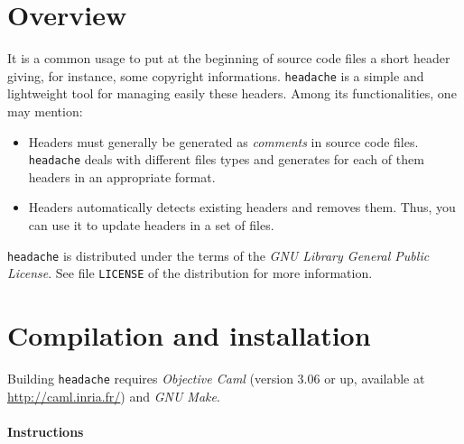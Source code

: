 \documentclass{article}
\title{\headache{}}
\author{Vincent Simonet}
\date{November, 2002}
\newcommand{\headache}{\texttt{headache}}
\begin{document}
\maketitle


\section{Overview}

It is a common usage to put at the beginning of source code files a
short header giving, for instance, some copyright informations.
\headache{} is a simple and lightweight tool for managing easily these
headers.  Among its functionalities, one may mention:
\begin{itemize}
\item Headers must generally be generated as \emph{comments} in source
  code files.  \headache{} deals with different files types and generates
  for each of them headers in an appropriate format.
\item Headers automatically detects existing headers and removes them.
  Thus, you can use it to update headers in a set of files.
\end{itemize}
\headache{} is distributed under the terms of the \emph{GNU Library General
  Public License}.  See file \verb+LICENSE+ of the distribution for
more information.


\section{Compilation and installation}

Building \headache{} requires \emph{Objective Caml} (version 3.06 or up,
available at \url{http://caml.inria.fr/}) and \emph{GNU Make}.  

\paragraph{Instructions}
\end{document}
